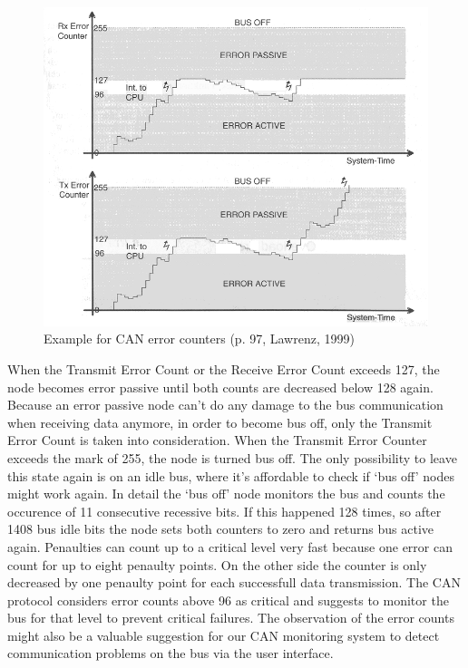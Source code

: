 	\begin{figure}[htb] \centering 
		\includegraphics[width=1\textwidth]{content/pictures/error_counter.png}
		\caption{Example for CAN error counters (p. 97, Lawrenz,
		1999)\cite{canbook-lawrenz}}
		\label{fig:error_counter}
	\end{figure}
	
	When the Transmit Error Count or the Receive Error Count exceeds 127, the node
	becomes error passive until both counts are decreased below 128 again. Because
	an error passive node can't do any damage to the bus communication when
	receiving data anymore, in order to become bus off, only the Transmit Error
	Count is taken into consideration. When the Transmit Error Counter exceeds the
	mark of 255, the node is turned bus off. The only possibility to leave this
	state again is on an idle bus, where it's affordable to check if `bus off' nodes
	might work again. In detail the `bus off' node monitors the bus and counts the
	occurence of 11 consecutive recessive bits. If this happened 128 times, so after
	1408 bus idle bits the node sets both counters to zero and returns bus active
	again. Penaulties can count up to a critical level very fast because one error
	can count for up to eight penaulty points. On the other side the counter is only
	decreased by one penaulty point for each successfull data transmission. The CAN
	protocol considers error counts above 96 as critical and suggests to monitor
	the bus for that level to prevent critical failures. The observation of the
	error counts might also be a valuable suggestion for our CAN monitoring system
	to detect communication problems on the bus via the user interface.
	
